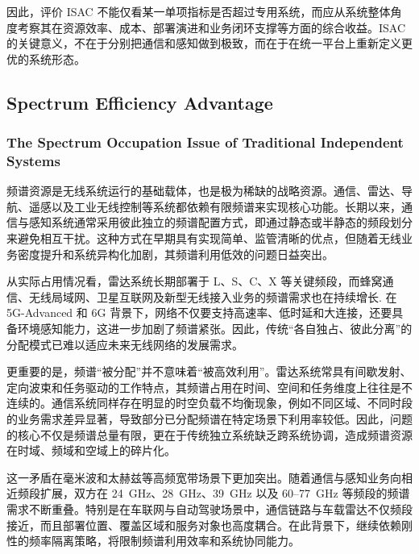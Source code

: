 因此，评价 ISAC 不能仅看某一单项指标是否超过专用系统，而应从系统整体角度考察其在资源效率、成本、部署演进和业务闭环支撑等方面的综合收益。ISAC 的关键意义，不在于分别把通信和感知做到极致，而在于在统一平台上重新定义更优的系统形态。

\subsection{Spectrum Efficiency Advantage}
\label{subsec:ch1-isac-core-value-spectrum}
\subsubsection{The Spectrum Occupation Issue of Traditional Independent Systems}
\label{subsubsec:ch1-isac-core-value-spectrum-occupation}

频谱资源是无线系统运行的基础载体，也是极为稀缺的战略资源。通信、雷达、导航、遥感以及工业无线控制等系统都依赖有限频谱来实现核心功能\cite{Goldsmith2005}。长期以来，通信与感知系统通常采用彼此独立的频谱配置方式，即通过静态或半静态的频段划分来避免相互干扰。这种方式在早期具有实现简单、监管清晰的优点，但随着无线业务密度提升和系统异构化加剧，其频谱利用低效的问题日益突出\cite{Gonzalez2024integrated}。

从实际占用情况看，雷达系统长期部署于 L、S、C、X 等关键频段，而蜂窝通信、无线局域网、卫星互联网及新型无线接入业务的频谱需求也在持续增长\cite{SkolnikRadarBook}. 在 5G-Advanced 和 6G 背景下，网络不仅要支持高速率、低时延和大连接，还要具备环境感知能力，这进一步加剧了频谱紧张\cite{Liu2022ISAC,Saad2020Vision6G,IMT2030Framework}。因此，传统“各自独占、彼此分离”的分配模式已难以适应未来无线网络的发展需求。

更重要的是，频谱“被分配”并不意味着“被高效利用”。雷达系统常具有间歇发射、定向波束和任务驱动的工作特点，其频谱占用在时间、空间和任务维度上往往是不连续的\cite{SkolnikRadarBook}。通信系统同样存在明显的时空负载不均衡现象，例如不同区域、不同时段的业务需求差异显著，导致部分已分配频谱在特定场景下利用率较低\cite{Haykin2005CognitiveRadio}。因此，问题的核心不仅是频谱总量有限，更在于传统独立系统缺乏跨系统协调，造成频谱资源在时域、频域和空域上的碎片化\cite{Liu2020JointRadarComm,Liu2022ISAC}。

这一矛盾在毫米波和太赫兹等高频宽带场景下更加突出。随着通信与感知业务向相近频段扩展，双方在 24~GHz、28~GHz、39~GHz 以及 60--77~GHz 等频段的频谱需求不断重叠\cite{Liu2022ISAC,Gonzalez2024integrated}。特别是在车联网与自动驾驶场景中，通信链路与车载雷达不仅频段接近，而且部署位置、覆盖区域和服务对象也高度耦合\cite{Sturm2011WaveformDesign,Kumari2018IEEE80211adRadar}。在此背景下，继续依赖刚性的频率隔离策略，将限制频谱利用效率和系统协同能力。

